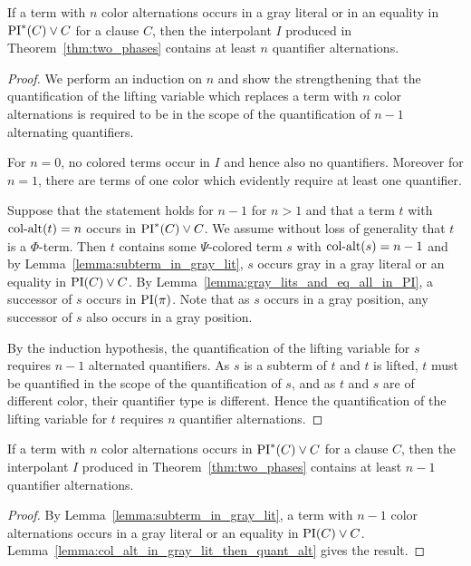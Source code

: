 \documentclass[%
	draft=false,%
	numbers=noendperiod,%
	11pt,%
	a4paper,%
	oneside,%
	openany,%
]{memoir}
\begin{document}
\begin{lemma}
	\label{lemma:col_alt_in_gray_lit_then_quant_alt}
	If a term with $n$ color alternations occurs in a gray literal or in an equality in $\operatorname{PI}^*(C) \lor C$ for a clause $C$, then the interpolant $I$ produced in Theorem~\ref{thm:two_phases} contains at least $n$ quantifier alternations.
\end{lemma}
\begin{proof}
	We perform an induction on $n$
	and show the strengthening that
	the quantification of the lifting variable which replaces a term with $n$ color alternations is required to be in the scope of the quantification of $n-1$ alternating quantifiers.

	For $n=0$, no colored terms occur in $I$ and hence also no quantifiers.
	Moreover for $n=1$, there are terms of one color which evidently require at least one quantifier.

	Suppose that the statement holds for $n-1$ for $n>1$ and that a term $t$ with $\operatorname{col-alt}(t) = n$ occurs in $\operatorname{PI}^*(C) \lor C$.
	We assume without loss of generality that $t$ is a $\Phi$-term.
	Then $t$ contains some $\Psi$-colored term $s$ with $\operatorname{col-alt}(s) = n-1$ and
	by Lemma~\ref{lemma:subterm_in_gray_lit}, $s$ occurs gray in a gray literal or an equality in $\operatorname{PI}(C) \lor C$.
	By Lemma~\ref{lemma:gray_lits_and_eq_all_in_PI}, a successor of $s$ occurs in $\operatorname{PI}(\pi)$. Note that as $s$ occurs in a gray position, any successor of $s$ also occurs in a gray position.

	By the induction hypothesis, the quantification of the lifting variable for $s$ requires $n-1$ alternated quantifiers.
	As $s$ is a subterm of $t$ and $t$ is lifted, $t$ must be quantified in the scope of the quantification of $s$, and as $t$ and $s$ are of different color, their quantifier type is different. 
	Hence the quantification of the lifting variable for $t$ requires $n$ quantifier alternations.
\end{proof}

\begin{lemma}
	\label{lemma:quant_alt_lower_bound}
	If a term with $n$ color alternations occurs in $\operatorname{PI}^*(C) \lor C$ for a clause $C$, then the interpolant $I$ produced in Theorem~\ref{thm:two_phases} contains at least $n-1$ quantifier alternations.
\end{lemma}
\begin{proof}
	By Lemma~\ref{lemma:subterm_in_gray_lit}, a term with $n-1$ color alternations occurs in a gray literal or an equality in $\operatorname{PI}(C) \lor C$.
	Lemma~\ref{lemma:col_alt_in_gray_lit_then_quant_alt} gives the result.
\end{proof}
\end{document}
